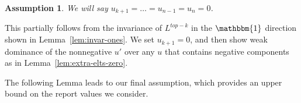 \documentclass[12pt]{article}
\newcommand{\Comments}{1}
\newcommand{\mynote}[2]{\ifnum\Comments=1\textcolor{#1}{#2}\fi}
\newcommand{\jessie}[1]{\mynote{purple}{[JF: #1]}}
\newcommand{\ones}{\mathbbm{1}}
\newtheorem{assumption}{Assumption}
\begin{document}
\begin{assumption}\label{assum:nonneg}
	We will say $u_{k+1} = \ldots = u_{n-1} = u_n = 0$.
\end{assumption}
This partially follows from the invariance of $L^{top-k}$ in the $\ones$ direction shown in Lemma~\ref{lem:invar-ones}.
We set $u_{k+1} = 0$, and then show weak dominance of the nonnegative $u'$ over any $u$ that contains negative components as in Lemma~\ref{lem:extra-elts-zero}.


The following Lemma leads to our final assumption, which provides an upper bound on the report values we consider.
\end{document}
